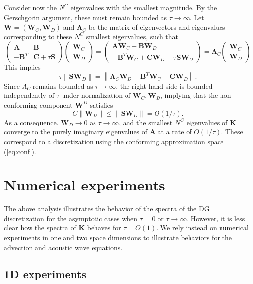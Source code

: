 \documentclass[10pt]{article}
\newcommand{\nor}[1]{\left\| #1 \right\|}
\begin{document}
Consider now the $N^C$ eigenvalues with the smallest magnitude.  By the Gerschgorin argument, these must remain bounded as $\tau \rightarrow \infty$.  Let $\bm{W} = (\bm{W}_C,\bm{W}_D)$ and $\bm{\Lambda}_C$ be the matrix of eigenvectors and eigenvalues corresponding to these $N^C$ smallest eigenvalues, such that
\[
\left(\begin{array}{cc}
\bm{A} & \bm{B}\\
-\bm{B}^T & \bm{C} + \tau \bm{S}
\end{array}\right)
\left(\begin{array}{c}
\bm{W}_C
\\
\bm{W}_D
\end{array}\right) = 
\left(\begin{array}{c}
\bm{A}\bm{W}_C + \bm{B}\bm{W}_D\\
-\bm{B}^T\bm{W}_C + \bm{C}\bm{W}_D + \tau \bm{S}\bm{W}_D
\end{array}\right)
= 
\bm{\Lambda}_C
\left(\begin{array}{c}
\bm{W}_C
\\
\bm{W}_D
\end{array}\right) 
\]
This implies 
\[
\tau \nor{\bm{S}\bm{W}_D} = \nor{\bm{\Lambda}_C \bm{W}_D + \bm{B}^T\bm{W}_C  - \bm{C}\bm{W}_D}.
\]
Since $\Lambda_C$ remains bounded as $\tau\rightarrow \infty$, the right hand side is bounded independently of $\tau$ under normalization of $\bm{W}_C,\bm{W}_D$, implying that the non-conforming component $\bm{W}^D$ satisfies
\[
C\nor{\bm{W}_D} \leq \nor{\bm{S}\bm{W}_D} = O(1/\tau).
\]
As a consequence, $\bm{W}_D \rightarrow 0$ as $\tau\rightarrow \infty$, and the smallest $N^C$ eigenvalues of $\bm{K}$ converge to the purely imaginary eigenvalues of $\bm{A}$ at a rate of $O(1/\tau)$.  These correspond to a discretization using the conforming approximation space (\ref{eq:conf}).

\section{Numerical experiments}

The above analysis illustrates the behavior of the spectra of the DG discretization for the asymptotic cases when $\tau = 0$ or $\tau \rightarrow \infty$.  However, it is less clear how the spectra of $\bm{K}$ behaves for $\tau = O(1)$.  We rely instead on numerical experiments in one and two space dimensions to illustrate behaviors for the advection and acoustic wave equations.  

\subsection{1D experiments}
\end{document}
